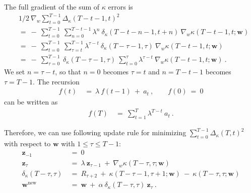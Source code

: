 \documentclass{article}
\newcommand\Bw{\bm{w}}
\newcommand\Bz{\bm{z}}
\newcommand\nn{\mathrm{new}}
\renewcommand{\leq}{\leqslant}
\begin{document}
\begin{appendices}
The full gradient of the sum of $\kappa$ errors is
\begin{align}
 &1/2 \ \nabla_{w}  \sum_{t=0}^{T-1}\Delta_{\kappa}(T-t-1,t)^2 \\ \nonumber
 &= \  
  - \ \sum_{t=0}^{T-1} \ \sum_{n=0}^{T-t-1}  \lambda^{n} \  \delta_{\kappa}(T-t-n-1,t+n) \ 
  \nabla_{w} \kappa(T-t-1,t;\Bw) \\ \nonumber
   &= \ - \ \sum_{t=0}^{T-1} \ \sum_{\tau=t}^{T-1}  \lambda^{\tau-t} \  
  \delta_{\kappa}(T-\tau-1,\tau) \ \nabla_{w} \kappa(T-t-1,t;\Bw) 
  \\ \nonumber
  &= \ - \ \sum_{\tau=0}^{T-1} \  \delta_{\kappa}(T-\tau-1,\tau) \
    \sum_{t=0}^{\tau} \lambda^{\tau-t} \ \nabla_{w} \kappa(T-t-1,t;\Bw) \ .
\end{align} 
We set $n=\tau-t$, so that $n=0$ becomes $\tau=t$ and $n=T-t-1$ becomes 
$\tau=T-1$.
The recursion
\begin{align}
  f(t) \ &= \ \lambda \ f(t-1) \ + \ a_t \ , \qquad
  f(0) \ = \ 0 
 \end{align}  
can be written as
\begin{align}
  f(T) \ &= \ \sum_{t=1}^{T} \lambda^{T-t} \ a_t \ .
\end{align}  

Therefore, we can use following update rule for minimizing 
$\sum_{t=0}^{T-1}\Delta_{\kappa}(T,t)^2$ with respect to $\Bw$ with
$1\leq \tau \leq T-1$:
\begin{align}
  \Bz_{-1} \ &= \ 0 \\
  \Bz_{\tau} \ &= \ \lambda \ \Bz_{\tau-1} \ + \ 
  \nabla_{w} \kappa(T-\tau,\tau;\Bw) \\
  \delta_{\kappa}(T-\tau,\tau) \ &= \ R_{\tau+2}  \ + \ 
  \kappa(T-\tau-1,\tau+1;\Bw) \ - \ \kappa(T-\tau,\tau;\Bw) \\
  \Bw^{\nn} \ &= \ \Bw \ + \ \alpha \ \delta_{\kappa}(T-\tau,\tau) \ \Bz_{\tau} \ .
\end{align}  



\end{appendices}
\end{document}
